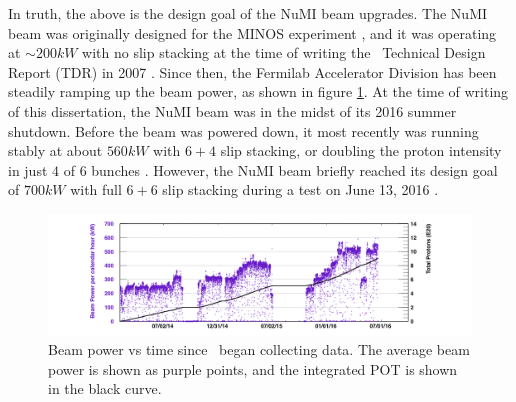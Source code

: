 In truth, the above is the design goal of the NuMI beam upgrades. The NuMI beam was originally designed for the MINOS experiment \cite{ref:TDRNuMI}, and it was operating at ${\sim}200\unit{kW}$ with no slip stacking at the time of writing the \nova~Technical Design Report (TDR) in 2007 \cite{ref:TDRNOvA}. Since then, the Fermilab Accelerator Division has been steadily ramping up the beam power, as shown in figure \ref{fig:BeamPower}. At the time of writing of this dissertation, the NuMI beam was in the midst of its 2016 summer shutdown. Before the beam was powered down, it most recently was running stably at about $560\unit{kW}$ with $6{+}4$ slip stacking, or doubling the proton intensity in just $4$ of $6$ bunches \cite{ref:IntensitykW, ref:IntensitySlip}. However, the NuMI beam briefly reached its design goal of $700\unit{kW}$ with full $6{+}6$ slip stacking during a test on June 13, 2016 \cite{ref:Intensity700}.
\begin{figure}[htb]
  \centering
  \includegraphics[width=1\textwidth]{figures/BeamPower.png}
  \caption[Beam Power vs Time]{Beam power vs time since \nova~began collecting data. The average beam power is shown as purple points, and the integrated POT is shown in the black curve.}
  \label{fig:BeamPower}
\end{figure}

